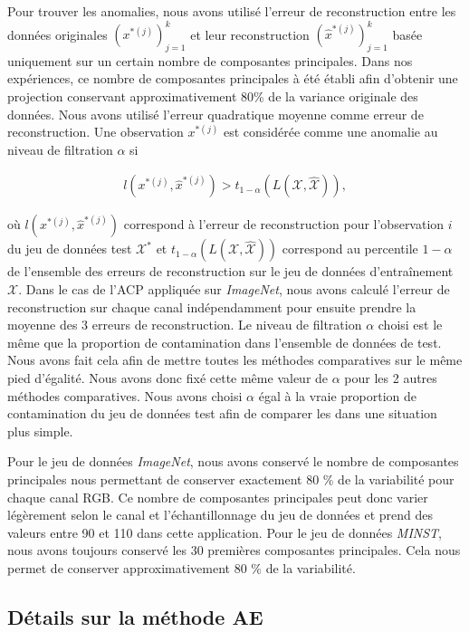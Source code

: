 Pour trouver les anomalies, nous avons utilisé l'erreur de reconstruction entre les données originales $(x^{*(j)})_{j=1}^k$ et
leur reconstruction $(\hat{x}^{*(j)})_{j=1}^k$ basée uniquement sur un certain nombre de composantes principales. Dans nos expériences, ce nombre de composantes principales à été établi afin d'obtenir une projection conservant approximativement 80\% de la variance originale des données. Nous avons utilisé l'erreur quadratique moyenne comme erreur de reconstruction. Une observation $x^{*(j)}$ est considérée comme une anomalie au niveau de filtration $\alpha$ si

\begin{gather} \label{eq:anomalie_mse}
l(x^{*(j)}, \hat{x}^{*(j)}) > t_{1-\alpha}(L(\mathcal{X}, \hat{\mathcal{X}})),
\end{gather}

où $l(x^{*(j)}, \hat{x}^{*(j)})$ correspond à l'erreur de reconstruction pour l'observation $i$ du jeu de données test $\mathcal{X^*}$ et $t_{1-\alpha}(L(\mathcal{X}, \hat{\mathcal{X}}))$ correspond au percentile $1-\alpha$ de l'ensemble des erreurs de reconstruction sur le jeu de données d'entraînement $\mathcal{X}$. Dans le cas de l'ACP appliquée sur \textit{ImageNet}, nous avons calculé l'erreur de reconstruction sur chaque canal indépendamment pour ensuite prendre la moyenne des 3 erreurs de reconstruction. Le niveau de filtration $\alpha$ choisi est le même que la proportion de contamination dans l'ensemble de données de test. Nous avons fait cela afin de mettre toutes les méthodes comparatives sur le même pied d'égalité. Nous avons donc fixé cette même valeur de $\alpha$ pour les 2 autres méthodes comparatives. Nous avons choisi $\alpha$ égal à la vraie proportion de contamination du jeu de données test afin de comparer les \DIFdelbegin {}\DIFdelend \DIFaddbegin {}\DIFaddend dans une situation plus simple.

Pour le jeu de données \textit{ImageNet}, nous avons conservé le nombre de composantes principales nous permettant de conserver exactement 80 \% de la variabilité pour chaque canal RGB. Ce nombre de composantes principales peut donc varier légèrement selon le canal et l'échantillonnage du jeu de données et prend des valeurs entre 90 et 110 dans cette application. Pour le jeu de données \textit{MINST}, nous avons toujours conservé les 30 premières composantes principales. Cela nous permet de conserver approximativement  80 \% de la variabilité. 

\subsection{Détails sur la méthode AE} \label{AE}

